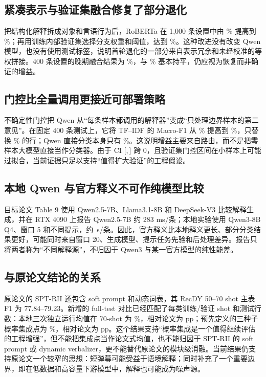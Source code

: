 \documentclass[UTF8,zihao=-4,a4paper]{ctexart}
\begin{document}
\subsection{紧凑表示与验证集融合修复了部分退化}

把结构化解释拆成对象和言语行为后，RoBERTa 在 1,000 条设置中由 \ImproveRobertaLargeStructured\% 提高到 \ImproveRobertaLargeCompact\%；再用训练内部验证集选择分支权重和阈值，达到 \ImproveRobertaLargeLateFusion\%。这种改进没有改变 Qwen 模型，也没有使用测试标签，说明首轮退化的一部分来自表示冗余和未经校准的等权拼接。400 条设置的晚期融合结果为 \ImproveRobertaSmallLateFusion\%，与 \ImproveRobertaSmallContent\% 基本持平，仍应视为恢复而非确证的增益。

\subsection{门控比全量调用更接近可部署策略}

不确定性门控把 Qwen 从“每条样本都调用的解释器”变成“只处理边界样本的第二意见”。在固定 400 条测试上，它将 TF--IDF 的 Macro-F1 从 \GateBaseMacroF\% 提高到 \GateMacroF\%，只替换 \GateReplacementPct\% 的行；Qwen 直接分类本身只有 \GateQwenMacroF\%。这说明增益主要来自路由，而不是把零样本大模型直接当作分类器。由于 CI [\GateCILowPP,\,\GateCIHighPP] 跨 0，且验证集门控区间在小样本上可能过拟合，当前证据只足以支持“值得扩大验证”的工程假设。

\subsection{本地 Qwen 与官方释义不可作纯模型比较}

目标论文 Table 9 使用 Qwen2.5-7B、Llama3.1-8B 和 DeepSeek-V3 比较解释生成，并在 RTX 4090 上报告 Qwen2.5-7B 约 283 ms/条；本地实验使用 Qwen3-8B Q4、窗口 5 和不同提示，约 \QwenGenerationMeanSeconds\,s/条。因此，官方释义比本地释义更长、部分分类结果更好，可能同时来自窗口 20、生成模型、提示任务先验和后处理差异。报告只将两者称为“不同解释源”，不归因于 Qwen3 与某一官方模型的纯性能差。

\subsection{与原论文结论的关系}

原论文的 SPT-RII 还包含 soft prompt 和动态词表，其 RecDY 50--70 shot 主表 F1 为 77.84--79.23。新增的 full-test 对比已经匹配了每类训练/验证 shot 和测试行数：本地三次独立运行均值在 70-shot 为 \PaperMatchedContentMeanSeventy\%，相对论文为 \PaperMatchedContentMeanDeltaSeventy pp；预先定义的三种子概率集成点为 \PaperMatchedContentEnsembleSeventy\%，相对论文为 \PaperMatchedContentEnsembleDeltaSeventy pp。这个结果支持“概率集成是一个值得继续评估的工程增强”，但不能把集成点当作论文式均值，也不能归因于 SPT-RII 的 soft prompt 或 dynamic verbalizer，更不能替代原论文的模块级消融。当前结果仍支持原论文一个较窄的思想：短弹幕可能受益于语境解释；同时补充了一个重要边界，即在低数据和高容量下游模型中，解释也可能成为噪声源。
\end{document}
